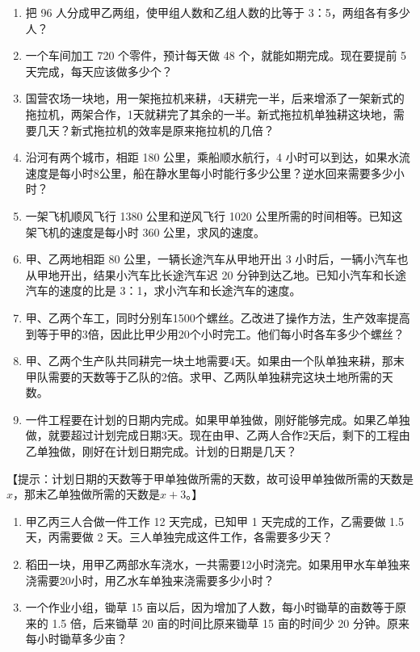 \begin{enumerate}
\item
  把 96 人分成甲乙两组，使甲组人数和乙组人数的比等于
  3：5，两组各有多少人？
\item
  一个车间加工 720 个零件，预计每天做 48 个，就能如期完成。现在要提前 5
  天完成，每天应该做多少个？
\item
  国营农场一块地，用一架拖拉机来耕，4天耕完一半，后来增添了一架新式的拖拉机，两架合作，1天就耕完了其余的一半。新式拖拉机单独耕这块地，需要几天？新式拖拉机的效率是原来拖拉机的几倍？
\item
  沿河有两个城市，相距 180 公里，乘船顺水航行，4
  小时可以到达，如果水流速度是每小时8公里，船在静水里每小时能行多少公里？逆水回来需要多少小时？
\item
  一架飞机顺风飞行 1380 公里和逆风飞行 1020
  公里所需的时间相等。已知这架飞机的速度是每小时 360 公里，求风的速度。
\item
  甲、乙两地相距 80 公里，一辆长途汽车从甲地开出 3
  小时后，一辆小汽车也从甲地开出，结果小汽车比长途汽车迟 20
  分钟到达乙地。已知小汽车和长途汽车的速度的比是
  3：1，求小汽车和长途汽车的速度。
\item
  甲、乙两个车工，同时分别车1500个螺丝。乙改进了操作方法，生产效率提高到等于甲的3倍，因此比甲少用20个小时完工。他们每小时各车多少个螺丝？
\item
  甲、乙两个生产队共同耕完一块土地需要4天。如果由一个队单独来耕，那末甲队需要的天数等于乙队的2倍。求甲、乙两队单独耕完这块土地所需的天数。
\item
  一件工程要在计划的日期内完成。如果甲单独做，刚好能够完成。如果乙单独做，就要超过计划完成日期3天。现在由甲、乙两人合作2天后，剩下的工程由乙单独做，刚好在计划日期完成。计划的日期是几天？
\end{enumerate}

【提示：计划日期的天数等于甲单独做所需的天数，故可设甲单独做所需的天数是\(x\)，那末乙单独做所需的天数是\(x + 3\)。】

\begin{enumerate}[start=10]
\item
  甲乙丙三人合做一件工作 12 天完成，已知甲 1 天完成的工作，乙需要做 1.5
  天，丙需要做 2 天。三人单独完成这件工作，各需要多少天？
\item
  稻田一块，用甲乙两部水车浇水，一共需要12小时浇完。如果用甲水车单独来浇需要20小时，用乙水车单独来浇需要多少小时？
\item
  一个作业小组，锄草 15
  亩以后，因为增加了人数，每小时锄草的亩数等于原来的 1.5 倍，后来锄草 20
  亩的时间比原来锄草 15 亩的时间少 20 分钟。原来每小时锄草多少亩？
\end{enumerate}

